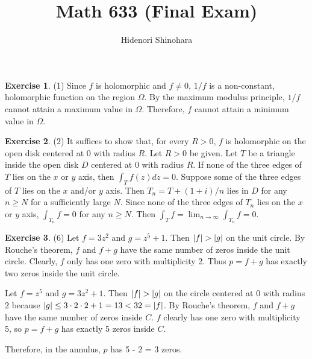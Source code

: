 \documentclass[12pt, psamsfonts]{amsart}
\theoremstyle{definition}
\newtheorem*{exer}{Exercise}
\theoremstyle{remark}
\numberwithin{equation}{section}
\begin{document}
\title{Math 633 (Final Exam)}
\author{Hidenori Shinohara}
\maketitle

\begin{exer}{(1)}
  Since $f$ is holomorphic and $f \ne 0$, $1 / f$ is a non-constant, holomorphic function on the region $\Omega$.
  By the maximum modulus principle, $1 / f$ cannot attain a maximum value in $\Omega$.
  Therefore, $f$ cannot attain a minimum value in $\Omega$.
\end{exer}

\begin{exer}{(2)}
  It suffices to show that, for every $R > 0$, $f$ is holomorphic on the open disk centered at 0 with radius $R$.
  Let $R > 0$ be given.
  Let $T$ be a triangle inside the open disk $D$ centered at 0 with radius $R$.
  If none of the three edges of $T$ lies on the $x$ or $y$ axis, then $\int_{T} f(z) dz = 0$.
  Suppose some of the three edges of $T$ lies on the $x$ and/or $y$ axis.
  Then $T_n = T + (1 + i) / n$ lies in $D$ for any $n \geq N$ for a sufficiently large $N$.
  Since none of the three edges of $T_n$ lies on the $x$ or $y$ axis, $\int_{T_n} f = 0$ for any $n \geq N$.
  Then $\int_{T} f = \lim_{n \rightarrow \infty} \int_{T_n} f = 0$.
\end{exer}

\begin{exer}{(6)}
  Let $f = 3z^2$ and $g = z^5 + 1$.
  Then $\abs{f} > \abs{g}$ on the unit circle.
  By Rouche's theorem, $f$ and $f + g$ have the same number of zeros inside the unit circle.
  Clearly, $f$ only has one zero with multiplicity 2.
  Thus $p = f + g$ has exactly two zeros inside the unit circle.

  Let $f = z^5$ and $g = 3z^2 + 1$.
  Then $\abs{f} > \abs{g}$ on the circle centered at 0 with radius 2 because $\abs{g} \leq 3 \cdot 2 \cdot 2 + 1 = 13 < 32 = \abs{f}$.
  By Rouche's theorem, $f$ and $f + g$ have the same number of zeros inside $C$.
  $f$ clearly has one zero with multiplicity 5, so $p = f + g$ has exactly 5 zeros inside $C$.

  Therefore, in the annulus, $p$ has 5 - 2 = 3 zeros.
\end{exer}
\end{document}
